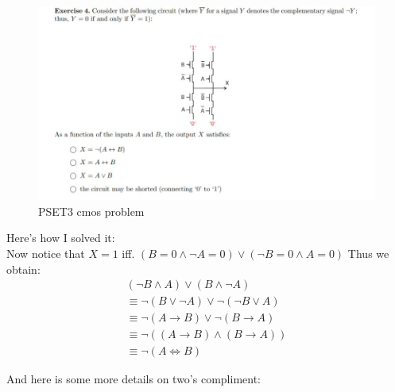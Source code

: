 \documentclass{article}
\theoremstyle{definition}
\numberwithin{equation}{subsection}
\numberwithin{remark}{subsection}
\begin{document}
\begin{figure}[H]
    \centering
    \includegraphics[scale=0.7]{epflSemesterOne/advancedComputation/figures/cmos2.JPG}
    \caption{PSET3 cmos problem}
    \label{fig:my_label}
\end{figure}

Here's how I solved it:
\\
Now notice that $X=1$ iff. $(B=0 \land \neg A = 0) \lor (\neg B = 0 \land A = 0)$ Thus we obtain:
\begin{align*}
    (\neg B \land A) \lor (B \land \neg A)\\
    \equiv \neg(B\lor \neg A) \lor \neg(\neg B \lor A)\\
    \equiv \neg(A \rightarrow B) \lor \neg(B \rightarrow A)\\
    \equiv \neg ((A \rightarrow B) \land (B \rightarrow A))\\
    \equiv \neg (A \iff B)
\end{align*}
\clearpage


And here is some more details on two's compliment:
\end{document}
